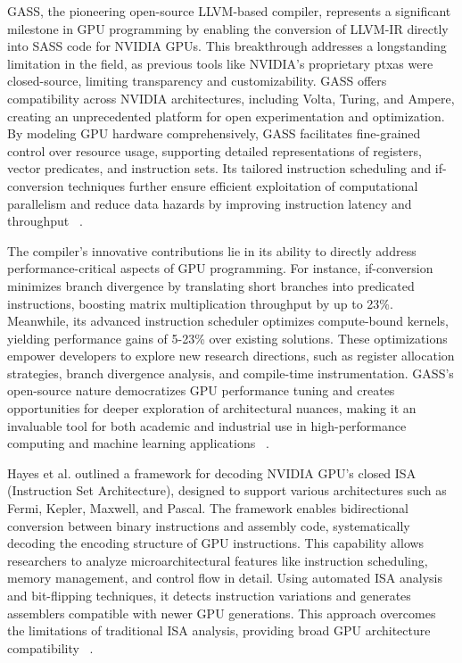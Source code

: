 GASS, the pioneering open-source LLVM-based compiler, represents a significant milestone in GPU programming by enabling the conversion of LLVM-IR directly into SASS code for NVIDIA GPUs. This breakthrough addresses a longstanding limitation in the field, as previous tools like NVIDIA's proprietary ptxas were closed-source, limiting transparency and customizability. GASS offers compatibility across NVIDIA architectures, including Volta, Turing, and Ampere, creating an unprecedented platform for open experimentation and optimization. By modeling GPU hardware comprehensively, GASS facilitates fine-grained control over resource usage, supporting detailed representations of registers, vector predicates, and instruction sets. Its tailored instruction scheduling and if-conversion techniques further ensure efficient exploitation of computational parallelism and reduce data hazards by improving instruction latency and throughput ~\cite{Yan2022}.

The compiler's innovative contributions lie in its ability to directly address performance-critical aspects of GPU programming. For instance, if-conversion minimizes branch divergence by translating short branches into predicated instructions, boosting matrix multiplication throughput by up to 23\%. Meanwhile, its advanced instruction scheduler optimizes compute-bound kernels, yielding performance gains of 5-23\% over existing solutions. These optimizations empower developers to explore new research directions, such as register allocation strategies, branch divergence analysis, and compile-time instrumentation. GASS’s open-source nature democratizes GPU performance tuning and creates opportunities for deeper exploration of architectural nuances, making it an invaluable tool for both academic and industrial use in high-performance computing and machine learning applications ~\cite{Yan2022}.

Hayes et al. outlined a framework for decoding NVIDIA GPU's closed ISA (Instruction Set Architecture), designed to support various architectures such as Fermi, Kepler, Maxwell, and Pascal. The framework enables bidirectional conversion between binary instructions and assembly code, systematically decoding the encoding structure of GPU instructions. This capability allows researchers to analyze microarchitectural features like instruction scheduling, memory management, and control flow in detail. Using automated ISA analysis and bit-flipping techniques, it detects instruction variations and generates assemblers compatible with newer GPU generations. This approach overcomes the limitations of traditional ISA analysis, providing broad GPU architecture compatibility ~\cite{Hayes2019}.

